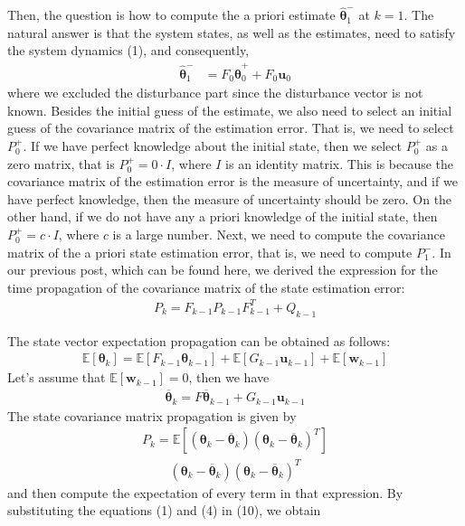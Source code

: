 Then, the question is how to compute the a priori estimate $\hat{\boldsymbol{\theta}}_{1}^{-}$ at $k=1$. The natural answer is that the system states, as well as the estimates, need to satisfy the system dynamics (1), and consequently,
\begin{align*}
	\hat{\boldsymbol{\theta}}_{1}^{-}& =F_{0}\hat{\boldsymbol{\theta}}_{0}^{+}+F_{0}\mathbf{u}_{0}
\end{align*}
where we excluded the disturbance part since the disturbance vector is not known. Besides the initial guess of the estimate, we also need to select an initial guess of the covariance matrix of the estimation error. That is, we need to select $P_{0}^{+}$. If we have perfect knowledge about the initial state, then we select $P_{0}^{+}$ as a zero matrix, that is $P_{0}^{+}=0\cdot I$, where $I$ is an identity matrix. This is because the covariance matrix of the estimation error is the measure of uncertainty, and if we have perfect knowledge, then the measure of uncertainty should be zero. On the other hand, if we do not have any a priori knowledge of the initial state, then $P_{0}^{+}=c\cdot I$, where $c$ is a large number. Next, we need to compute the covariance matrix of the a priori state estimation error, that is, we need to compute $P_{1}^{-}$. In our previous post, which can be found here, we derived the expression for the time propagation of the covariance matrix of the state estimation error:
\begin{align*}
	P_{k}=F_{k-1}P_{k-1}F_{k-1}^{T}+Q_{k-1}
\end{align*}

The state vector expectation propagation can be obtained as follows:
\begin{align*}
	\mathbb{E}[\boldsymbol{\theta}_{k}]=\mathbb{E}[F_{k-1}\boldsymbol{\theta}_{k-1}]+\mathbb{E}[G_{k-1}\mathbf{u}_{k-1}]+\mathbb{E}[\mathbf{w}_{k-1}]
\end{align*}
Let's assume that $\mathbb{E}[\mathbf{w}_{k-1}]=0$, then we have
\begin{align*}
	\overline{\boldsymbol{\theta}}_{k}=F\overline{\boldsymbol{\theta}}_{k-1}+G_{k-1}\mathbf{u}_{k-1}
\end{align*}
The state covariance matrix propagation is given by
\begin{align*}
	P_{k}=\mathbb{E}[(\boldsymbol{\theta}_{k}-\overline{\boldsymbol{\theta}}_{k})(\boldsymbol{\theta}_{k}-\overline{\boldsymbol{\theta}}_{k})^{T}]
\end{align*}
\begin{align*}
	(\boldsymbol{\theta}_{k}-\overline{\boldsymbol{\theta}}_{k})(\boldsymbol{\theta}_{k}-\overline{\boldsymbol{\theta}}_{k})^{T}
\end{align*}
and then compute the expectation of every term in that expression. By substituting the equations (1) and (4) in (10), we obtain


